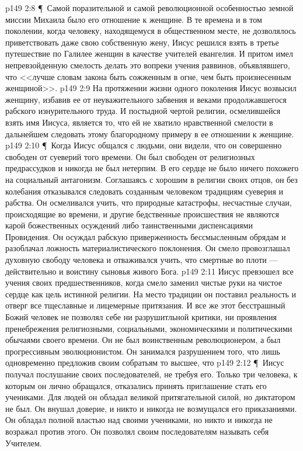 \vs p149 2:8 \P\ Самой поразительной и самой революционной особенностью земной миссии Михаила было его отношение к женщине. В те времена и в том поколении, когда человеку, находящемуся в общественном месте, не дозволялось приветствовать даже свою собственную жену, Иисус решился взять в третье путешествие по Галилее женщин в качестве учителей евангелия. И притом имел непревзойденную смелость делать это вопреки учения раввинов, объявлявшего, что <<лучше словам закона быть сожженным в огне, чем быть произнесенным женщиной>>.
\vs p149 2:9 На протяжении жизни одного поколения Иисус возвысил женщину, избавив ее от неуважительного забвения и веками продолжавшегося рабского изнурительного труда. И постыдной чертой религии, осмелившейся взять имя Иисуса, является то, что ей не хватило нравственной смелости в дальнейшем следовать этому благородному примеру в ее отношении к женщине.
\vs p149 2:10 \P\ Когда Иисус общался с людьми, они видели, что он совершенно свободен от суеверий того времени. Он был свободен от религиозных предрассудков и никогда не был нетерпим. В его сердце не было ничего похожего на социальный антагонизм. Соглашаясь с хорошим в религии своих отцов, он без колебания отказывался следовать созданным человеком традициям суеверия и рабства. Он осмеливался учить, что природные катастрофы, несчастные случаи, происходящие во времени, и другие бедственные происшествия не являются карой божественных осуждений либо таинственными диспенсациями Провидения. Он осуждал рабскую приверженность бессмысленным обрядам и разоблачал ложность материалистического поклонения. Он смело провозглашал духовную свободу человека и отваживался учить, что смертные во плоти --- действительно и воистину сыновья живого Бога.
\vs p149 2:11 Иисус превзошел все учения своих предшественников, когда смело заменил чистые руки на чистое сердце как цель истинной религии. На место традиции он поставил реальность и отверг все тщеславные и лицемерные притязания. И все же этот бесстрашный Божий человек не позволял себе ни разрушитльной критики, ни проявления пренебрежения религиозными, социальными, экономическими и политическими обычаями своего времени. Он не был воинственным революционером, а был прогрессивным эволюционистом. Он занимался разрушением того, что  лишь одновременно предложив своим собратьям то высшее, что 
\vs p149 2:12 \P\ Иисус получал послушание своих последователей, не требуя его. Только три человека, к которым он лично обращался, отказались принять приглашение стать его учениками. Для людей он обладал великой притягательной силой, но диктатором не был. Он внушал доверие, и никто и никогда не возмущался его приказаниями. Он обладал полной властью над своими учениками, но никто и никогда не возражал против этого. Он позволял своим последователям называть себя Учителем.
